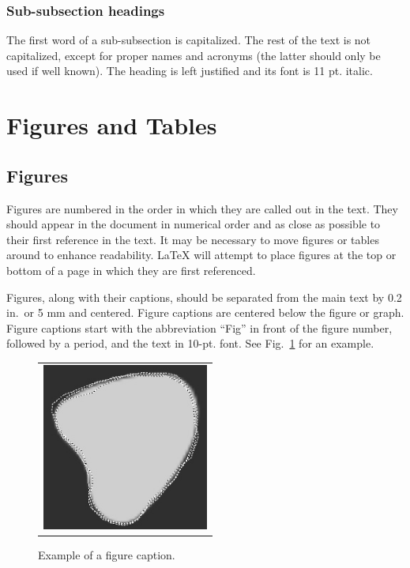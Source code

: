 \documentclass[12pt]{spieman}  %
\begin{document}
\begin{spacing}{2}
\subsubsection{Sub-subsection headings}
The first word of a sub-subsection is capitalized. The rest of the text is not capitalized, except for proper names and acronyms (the latter should only be used if well known). The heading is left justified and its font is 11 pt. italic. 

\section{Figures and Tables}

\subsection{Figures}

Figures are numbered in the order in which they are called out in the text. They should appear in the document in numerical order and as close as possible to their first reference in the text. It may be necessary to move figures or tables around to enhance readability. LaTeX will attempt to place figures at the top or bottom of a page in which they are first referenced.

Figures, along with their captions, should be separated from the main text by  0.2 in.\ or 5 mm and centered. Figure captions are centered below the figure or graph. Figure captions start with the abbreviation ``Fig'' in front of the figure number, followed by a period, and the text in 10-pt. font. See Fig.~\ref{fig:example} for an example.

\begin{figure}
\begin{center}
\begin{tabular}{c}
\includegraphics[height=5.5cm]{mcr3b.eps}
\end{tabular}
\end{center}
\caption 
{ \label{fig:example}
Example of a figure caption. } 
\end{figure} 


\end{spacing}
\end{document}
